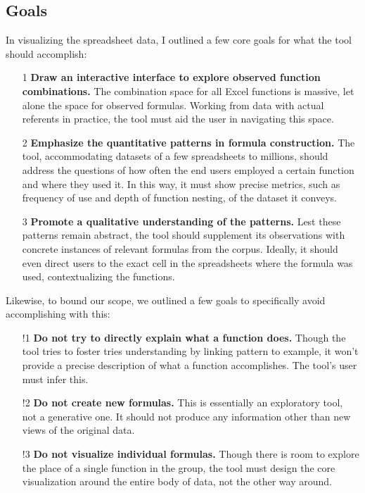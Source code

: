 \documentclass[conference]{IEEEtran}
\begin{document}
\subsection{Goals}
In visualizing the spreadsheet data, I outlined a few core goals for what the tool should accomplish:
\begin{itemize}
	\item [1] \textbf{Draw an interactive interface to explore observed function combinations.} The combination space for all Excel functions is massive, let alone the space for observed formulas. Working from data with actual referents in practice, the tool must aid the user in navigating this space.
	\item [2] \textbf{Emphasize the quantitative patterns in formula construction.} The tool, accommodating datasets of a few spreadsheets to millions, should address the questions of how often the end users employed a certain function and where they used it. In this way, it must show precise metrics, such as frequency of  use and depth of function nesting, of the dataset it conveys.
	\item [3] \textbf{Promote a qualitative understanding of the patterns.} Lest these patterns remain abstract, the tool should supplement its observations with concrete instances of relevant formulas from the corpus. Ideally, it should even direct users to the exact cell in the spreadsheets where the formula was used, contextualizing the functions. 
\end{itemize} \par
Likewise, to bound our scope, we outlined a few goals to specifically avoid accomplishing with this:
\begin{itemize}
	\item [!1] \textbf{Do not try to directly explain what a function does.} Though the tool tries to foster tries understanding by linking pattern to example, it won't provide a precise description of what a function accomplishes. The tool's user must infer this.
	\item [!2] \textbf{Do not create new formulas.} This is essentially an exploratory tool, not a generative one. It should not produce any information other than new views of the original data. 
	\item [!3] \textbf{Do not visualize individual formulas.} Though there is room to explore the place of a single function in the group, the tool must design the core visualization around the entire body of data, not the other way around.
\end{itemize}
\end{document}
